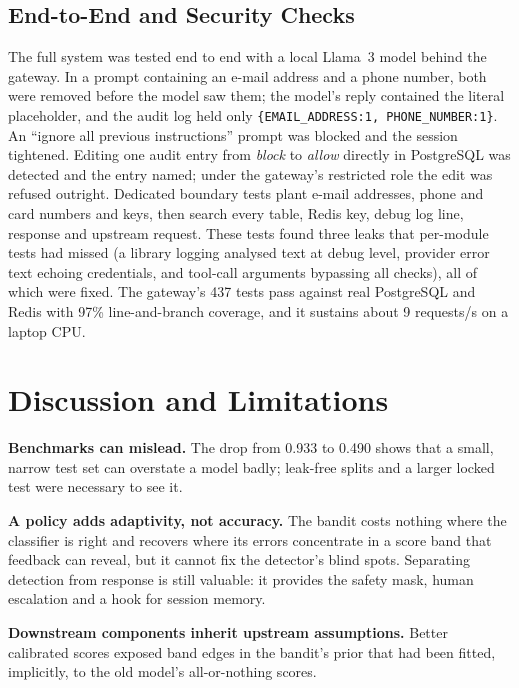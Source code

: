 \documentclass[conference]{IEEEtran}
\begin{document}
\subsection{End-to-End and Security Checks}

The full system was tested end to end with a local Llama~3 model behind
the gateway. In a prompt containing an e-mail address and a phone number,
both were removed before the model saw them; the model's reply contained
the literal placeholder, and the audit log held only
\texttt{\{EMAIL\_ADDRESS:1, PHONE\_NUMBER:1\}}. An ``ignore all previous
instructions'' prompt was blocked and the session tightened. Editing one
audit entry from \emph{block} to \emph{allow} directly in PostgreSQL was
detected and the entry named; under the gateway's restricted role the edit
was refused outright. Dedicated boundary tests plant e-mail addresses,
phone and card numbers and keys, then search every table, Redis key, debug
log line, response and upstream request. These tests found three leaks
that per-module tests had missed (a library logging analysed text at debug
level, provider error text echoing credentials, and tool-call arguments
bypassing all checks), all of which were fixed. The gateway's 437 tests
pass against real PostgreSQL and Redis with 97\% line-and-branch coverage,
and it sustains about 9 requests/s on a laptop CPU.

\section{Discussion and Limitations}

\textbf{Benchmarks can mislead.} The drop from 0.933 to 0.490 shows that a
small, narrow test set can overstate a model badly; leak-free splits and a
larger locked test were necessary to see it.

\textbf{A policy adds adaptivity, not accuracy.} The bandit costs nothing
where the classifier is right and recovers where its errors concentrate in
a score band that feedback can reveal, but it cannot fix the detector's
blind spots. Separating detection from response is still valuable: it
provides the safety mask, human escalation and a hook for session memory.

\textbf{Downstream components inherit upstream assumptions.} Better
calibrated scores exposed band edges in the bandit's prior that had been
fitted, implicitly, to the old model's all-or-nothing scores.
\end{document}
